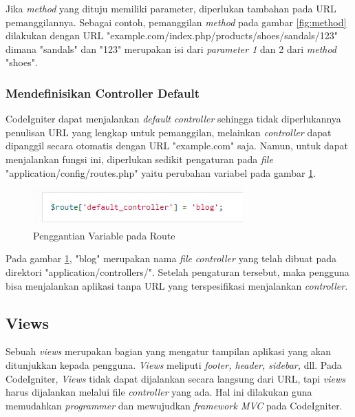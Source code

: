 	Jika \textit{method} yang dituju memiliki parameter, diperlukan tambahan pada URL pemanggilannya. Sebagai contoh, pemanggilan \textit{method}	pada gambar \ref{fig:method} dilakukan dengan URL "example.com/index.php/products/shoes/sandals/123" dimana "sandals" dan "123" merupakan isi dari \textit{parameter 1} dan 2 dari \textit{method} "shoes".
	
\subsubsection{Mendefinisikan Controller Default}
\label{subsub: defaulController}

	CodeIgniter dapat menjalankan \textit{default controller} sehingga tidak diperlukannya penulisan URL yang lengkap untuk pemanggilan, melainkan \textit{controller} dapat dipanggil secara otomatis dengan URL "example.com" saja. Namun, untuk dapat menjalankan fungsi ini, diperlukan sedikit pengaturan pada \textit{file} "application/config/routes.php" yaitu perubahan variabel pada gambar \ref{fig:route}.
	
	\begin{figure}[H]
		\centering
		\includegraphics[scale=1]{Gambar/route}
		\caption{Penggantian Variable pada Route}
		\label{fig:route}
	\end{figure}
	
	Pada gambar \ref{fig:route}, "blog" merupakan nama \textit{file} \textit{controller} yang telah dibuat pada direktori "application/controllers/". Setelah pengaturan tersebut, maka pengguna bisa menjalankan aplikasi tanpa URL yang terspesifikasi menjalankan \textit{controller}.
	
	\subsection{Views}
	\label{sub: views}
	
	Sebuah \textit{views} merupakan bagian yang mengatur tampilan aplikasi yang akan ditunjukkan kepada pengguna. \textit{Views} meliputi \textit{footer, header, sidebar,} dll.
	Pada CodeIgniter, \textit{Views} tidak dapat dijalankan secara langsung dari URL, tapi \textit{views} harus dijalankan melalui file \textit{controller} yang ada. Hal ini dilakukan guna memudahkan \textit{programmer} dan mewujudkan \textit{framework MVC} pada CodeIgniter.
	
